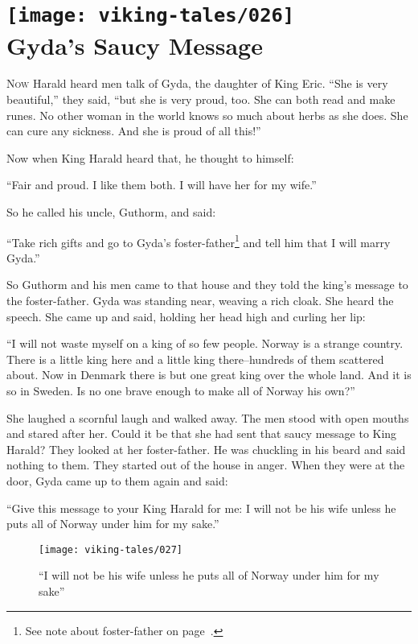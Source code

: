 \chapter[Gyda's Saucy Message]{
    \texttt{[image: viking-tales/026]}\\
    Gyda's Saucy Message}

\lettrine{N}{ow} Harald heard men talk of Gyda, the daughter of King
Eric.
\baselineskip
``She is very beautiful,'' they said, ``but she is very proud, too. She
can both read and make runes. No other woman in the world knows so much
about herbs as she does. She can cure any sickness. And she is proud of
all this!''

Now when King Harald heard that, he thought to himself:

``Fair and proud. I like them both. I will have her for my wife.''

So he called his uncle, Guthorm, and said:

``Take rich gifts and go to Gyda's foster-father\footnote{See note about
foster-father on page~\pageref{foster-father}.} and tell him that I will
marry Gyda.''

So Guthorm and his men came to that house and they told the king's
message to the foster-father. Gyda was standing near, weaving a rich
cloak. She heard the speech. She came up and said, holding her head high
and curling her lip:

``I will not waste myself on a king of so few people. Norway is a
strange country. There is a little king here and a little king
there--hundreds of them scattered about. Now in Denmark there is but one
great king over the whole land. And it is so in Sweden. Is no one brave
enough to make all of Norway his own?''

She laughed a scornful laugh and walked away. The men stood with open
mouths and stared after her. Could it be that she had sent that saucy
message to King Harald? They looked at her foster-father. He was
chuckling in his beard and said nothing to them. They started out of the
house in anger. When they were at the door, Gyda came up to them again
and said:

``Give this message to your King Harald for me: I will not be his wife
unless he puts all of Norway under him for my sake.''

\begin{figure}[ht]
    \centering
    \texttt{[image: viking-tales/027]}
    \caption{``I will not be his wife unless he puts all of Norway under
        him for my sake''}
\end{figure}

